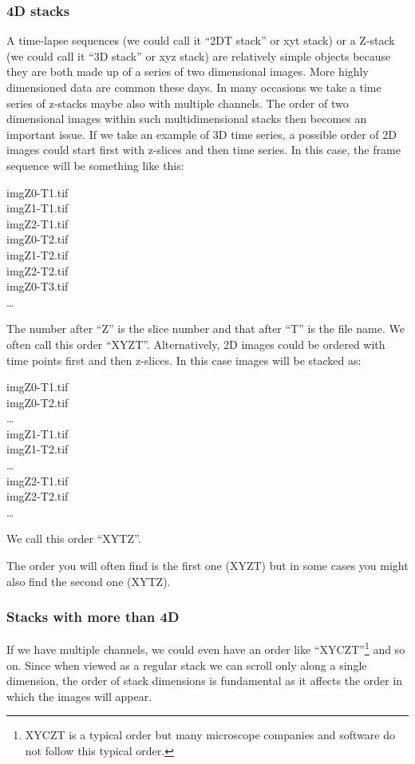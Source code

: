 \subsubsection{4D stacks}

A time-lapse sequences (we could call it ``2DT stack'' or xyt stack) or a Z-stack (we could call it ``3D stack'' or xyz stack) are relatively simple objects because they are both made up of a series of two dimensional images. More highly dimensioned data are common these days. In many occasions we take a time series of z-stacks maybe also with multiple channels. The order of two dimensional images within such multidimensional stacks then becomes an important issue. If we take an example of 3D time series, a possible order of 2D images could start first with z-slices and then time series. In this case, the frame sequence will be something like this:

imgZ0-T1.tif\\
imgZ1-T1.tif\\
imgZ2-T1.tif\\
imgZ0-T2.tif\\
imgZ1-T2.tif\\
imgZ2-T2.tif\\
imgZ0-T3.tif\\
\ldots

The number after ``Z'' is the slice number and that after ``T'' is the file name. We often call this order ``XYZT''. Alternatively, 2D images could be ordered with time points first and then z-slices. In this case images will be stacked as:

imgZ0-T1.tif\\
imgZ0-T2.tif\\
\ldots\\
imgZ1-T1.tif\\
imgZ1-T2.tif\\
\ldots\\
imgZ2-T1.tif\\
imgZ2-T2.tif\\
\ldots

We call this order ``XYTZ''. 

The order you will often find is the first one (XYZT) but in some
cases you might also find the second one (XYTZ). 

\subsubsection{Stacks with more than 4D}

If we have multiple channels, we could even have an order like ``XYCZT''\footnote{XYCZT is a typical order but many microscope companies and software do not follow this typical order.} and so on. Since when viewed as a regular stack we can scroll only along a single dimension, the order of stack dimensions is fundamental as it affects the order in which the images will appear. 

